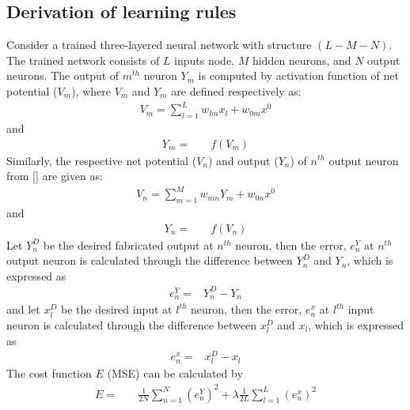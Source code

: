 
\appendixtitleon
\begin{appendices}
    \setcounter{equation}{0}


    \section*{Derivation of learning rules}\label{apendix:derivation_of_learning_rule} 

        Consider a trained three-layered neural network with structure $(L-M-N)$. The trained network consists of $L$ inputs node, $M$ hidden neurons, and $N$ output neurons. The output of $m^{th}$ neuron $Y_m$ is computed by activation function of net potential ($V_m$), where $V_m$ and $Y_m$ are defined respectively as: 
        \begin{align} \label{eqn:Vm}
            V_m =  \sum \limits_{l=1}^{L} w_{lm}x_{l} + w_{0m}x^{0}
        \end{align} and	
        \begin{align}\label{eqn:Ym}	
            Y_m =&\quad f(V_m)
        \end{align}
        Similarly, the respective net potential ($V_n$) and output ($Y_n$) of $n^{th}$ output neuron from [] are given as:
        \begin{align}\label{eqn:Vn}
            V_n =\sum \limits_{m=1}^{M} w_{mn}Y_{m} + w_{0n}x^{0} 
        \end{align} and 
        \begin{align} \label{eqn:Yn}
            Y_n =& \quad f(V_n)  
        \end{align}
        Let $Y_n^D$ be the desired fabricated output at $n^{th}$ neuron, then the error, $e_n^Y$ at $n^{th}$ output neuron is calculated through the difference between $Y_n^D$ and $Y_n$, which is expressed as
        \begin{align} \label{eqn:eny} 
            e_n^Y =& Y_n^D - Y_n
        \end{align} 
        and let $x_l^D$ be the desired input at $l^{th}$ neuron, then the error, $e_n^x$ at $l^{th}$ input neuron is calculated through the difference between $x_l^D$ and $x_l$, which is expressed as
        \begin{align} \label{eqn:enx} 
            e_n^x =& x_l^D - x_l
        \end{align} 
        The cost function $E$ (MSE) can be calculated by
        \begin{align} \label{eqn:mse}
            E =& \quad \frac{1}{2N} \sum \limits_{n=1}^{N} (e_n^Y)^{2} + \lambda \frac{1}{2L} \sum \limits_{l=1}^{L} (e_n^x)^{2}
        \end{align}
         

\end{appendices}
